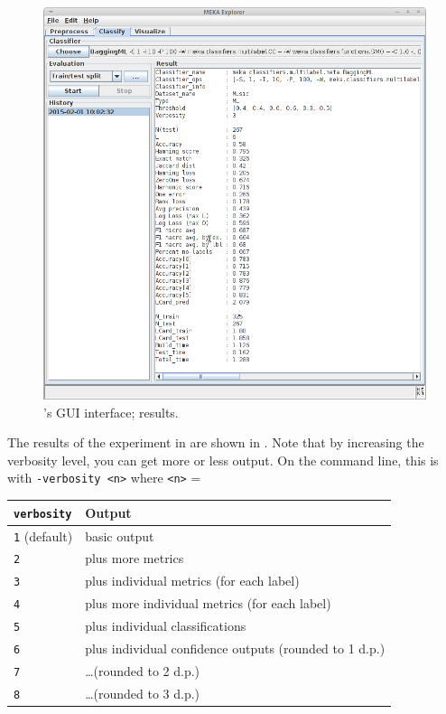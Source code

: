 \documentclass[11pt]{article}
\begin{document}
\begin{figure}
	\centering
	\includegraphics[height=0.95\textwidth]{GUI04.png}
	\caption{\label{screen:result} 's GUI interface; results.}
\end{figure}

The results of the experiment in  are shown in . Note that by increasing the verbosity level, you can get more or less output. On the command line, this is with \texttt{-verbosity <n>} where \texttt{<n>} = 
\begin{center}
\begin{tabular}{ll}
	\hline
	\texttt{verbosity}       & Output \\
	\hline
	\texttt{1} (default) & basic output \\
	 \texttt{2}           & plus more metrics \\
	  \texttt{3}           & plus individual metrics (for each label) \\
	   \texttt{4}           & plus more individual metrics (for each label) \\
		\texttt{5}           & plus individual classifications \\
	  \texttt{6}           & plus individual confidence outputs (rounded to 1 d.p.) \\
	   \texttt{7}           & \ldots (rounded to 2 d.p.) \\
		\texttt{8}           & \ldots (rounded to 3 d.p.) \\
	\hline
\end{tabular}
\end{center}
\end{document}
